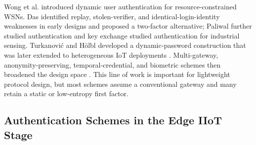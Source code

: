 \documentclass[cmc,article,submit,moreauthors,pdftex]{Definitions/tsp}
\providecommand{\DIFadd}[1]{{\protect\color{blue} \sf #1}} %
\providecommand{\DIFdel}[1]{{\protect\color{red} \scriptsize #1}} %
\providecommand{\DIFaddbegin}{} %
\providecommand{\DIFaddend}{} %
\providecommand{\DIFdelbegin}{} %
\providecommand{\DIFdelend}{} %
\begin{document}
Wong et al. \cite{wong} introduced dynamic \DIFdelbegin \DIFdel{user }\DIFdelend authentication for resource-constrained WSNs. Das \cite{das} identified \DIFdelbegin \DIFdel{replay, stolen-verifier, and identical-login-identity }\DIFdelend weaknesses in early designs\DIFdelbegin \DIFdel{and proposed a two-factor alternative}\DIFdelend ; Paliwal \cite{paliwal} \DIFdelbegin \DIFdel{further studied authentication and key exchange }\DIFdelend \DIFaddbegin \DIFadd{studied authentication }\DIFaddend for industrial sensing. Turkanovi\'c and H\"olbl \cite{turkanovic2013} developed a dynamic-password construction \DIFdelbegin \DIFdel{that was }\DIFdelend later extended to heterogeneous IoT deployments \cite{turkanovic2014}. Multi-gateway, anonymity-preserving, temporal-credential, and biometric schemes \DIFdelbegin \DIFdel{then }\DIFdelend broadened the design space \DIFdelbegin \DIFdel{\cite{amin,lu,wu2017multigateway,jiang,li2018threefactor,azrour}}\DIFdelend \DIFaddbegin \DIFadd{\cite{amin,jiang,li2018threefactor}}\DIFaddend . This line of work is important for lightweight protocol design, but most schemes assume a conventional gateway and many retain a static or low-entropy first factor.

\subsection{Authentication Schemes in the Edge IIoT Stage}
\end{document}
